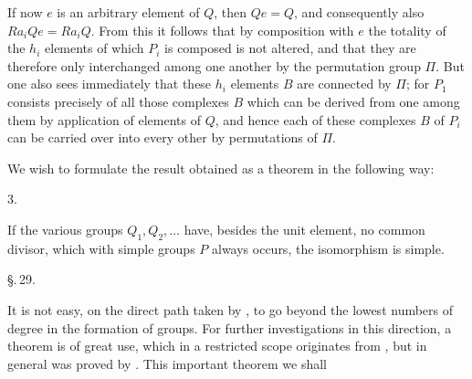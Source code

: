 If now $e$ is an arbitrary element of $Q$, then $Qe = Q$,
and consequently also $Ra_iQe = Ra_iQ$. From this it follows that by
composition with $e$ the totality of the $h_i$ elements of which
$P_i$ is composed is not altered, and that they are therefore
only interchanged among one another by the permutation group $\Pi$.
But one also sees immediately that these $h_i$ elements $B$ are  connected by $\Pi$; for $P_1$ consists precisely
of all those complexes $B$ which can be derived from one among them by
application of elements of $Q$, and
hence each of these complexes $B$ of $P_i$ can be carried over into
every other by permutations of $\Pi$.

We wish to formulate the result obtained as a theorem
in the following way:

3.\ 

If the various groups $Q_1, Q_2, \ldots$ have, besides the
unit element, no common divisor, which with simple groups $P$ always occurs, the isomorphism is simple.

\begin{center}
\S.\,29.

\end{center}

It is not easy, on the direct path taken by ,
to go beyond the lowest numbers of degree in the
formation of groups. For further investigations
in this direction, a theorem is of great use, which in a restricted
scope originates from , but in general
was proved by . This important theorem we shall
